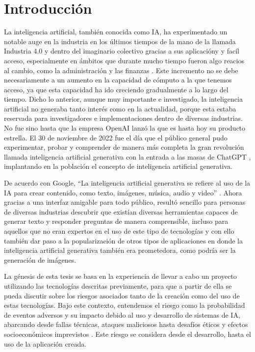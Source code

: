 
\chapter{Introducción}
La inteligencia artificial, también conocida como IA, ha experimentado un notable auge en la industria en los últimos tiempos
de la mano de la llamada Industria 4.0 \cite{intro1} y dentro del imaginario colectivo gracias a sus aplicacióny y facíl acceso, 
especialmente en ámbitos que durante mucho tiempo fueron algo reacios al cambio, como la administración y las finanzas \cite{intro2}. 
Este incremento no se debe necesariamente a un aumento en la capacidad de cómputo a la que tenemos acceso, 
ya que esta capacidad ha ido creciendo gradualmente a lo largo del tiempo. Dicho lo anterior, aunque muy importante e investigado, 
la inteligencia artificial no generaba tanto interés como en la actualidad, porque esta estaba reservada para investigadores e implementaciones dentro de diversas industrias.
No fue sino hasta que la empresa OpenAI lanzó la que es hasta hoy su producto estrella. El 30 de noviembre de 2022 fue  el día que el público general 
pudo experimentar, probar y comprender de manera más completa la gran revolución llamada inteligencia artificial generativa con la entrada a las masas de ChatGPT \cite{intro3},
implantando en la población el concepto de inteligencia artificial generativa.

De acuerdo con Google, ``La inteligencia artificial generativa se refiere al uso de la IA para crear contenido, como texto, imágenes, 
música, audio y video'' \cite{google1}. Ahora gracias a una interfaz amigable para todo público, resultó sencillo para personas de diversas industrias descubrir que existían 
diversas herramientas capaces de generar texto y responder preguntas de manera comprensible, incluso para aquellos que no eran expertos 
en el uso de este tipo de tecnologías y con ello también dar paso a la popularización de otros tipos de aplicaciones en donde 
la inteligencia artificial generativa también era prometedora, como podría ser la generación de imágenes.

La génesis de esta tesis se basa en la experiencia de llevar a cabo un proyecto utilizando las tecnologías descritas previamente,
para que a partir de ella se pueda discutir sobre los riesgos asociados tanto de la creación como del uso de estas tecnologías. 
Bajo este contexto, entendemos el riesgo como la probabilidad de eventos adversos y su impacto debido al uso y desarrollo de sistemas de IA, 
abarcando desde fallas técnicas, ataques maliciosos hasta desafíos éticos y efectos socioeconómicos imprevistos \cite{intro1}. Este 
riesgo se considera desde el desarrollo, hasta el uso de la aplicación creada.

